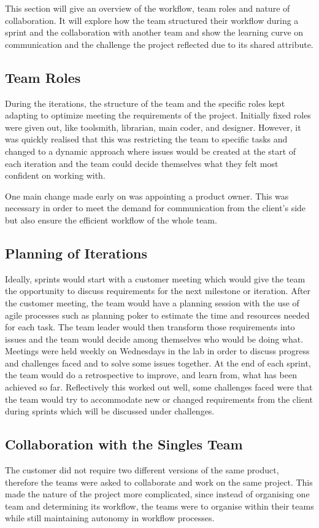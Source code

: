 \documentclass{l3proj}
\begin{document}
This section will give an overview of the workflow, team roles and nature of collaboration.  It will explore how the team structured their workflow during a sprint and the collaboration with another team and show the learning curve on  communication and the challenge the project reflected due to its shared attribute.

\subsection{Team Roles}
During the iterations, the structure of the team and the specific roles kept adapting to optimize meeting the requirements of the project. Initially  fixed roles were given out, like toolsmith, librarian, main coder, and designer. \cite{mythical} However, it was quickly realised that this was restricting the team to specific tasks and changed to a dynamic approach where issues would be created at the start of each iteration and the team could decide themselves what they felt most confident on working with. 

One main change made early on was appointing a product owner. This was necessary in order to meet the demand for communication from the client’s side but also ensure the efficient workflow of the whole team.

\subsection{Planning of Iterations} 
Ideally, sprints would start with a customer meeting which would give the team the opportunity to discuss requirements for the next milestone or iteration. After the customer meeting, the team would have a planning session with the use of agile processes such as planning poker to estimate the time and resources needed for each task. The team leader would then transform those requirements into issues and the team would decide among themselves who would be doing what.  Meetings were held weekly on Wednesdays in the lab in order to discuss progress and challenges faced and to solve some issues together. At the end of each sprint, the team would do a retrospective to improve, and learn from, what has been achieved so far. Reflectively this worked out well, some challenges faced were that the team would try to accommodate new or changed requirements from the client during sprints which will be discussed under challenges. 


\subsection{Collaboration with the Singles Team}
\label{subsec:collaboration}
The customer did not require two different versions of the same product, therefore the teams were asked to collaborate and work on the same project. This made the nature of the project more complicated, since instead of organising one team and determining its workflow, the teams  were to organise within their teams while still maintaining autonomy in workflow processes.
\end{document}
